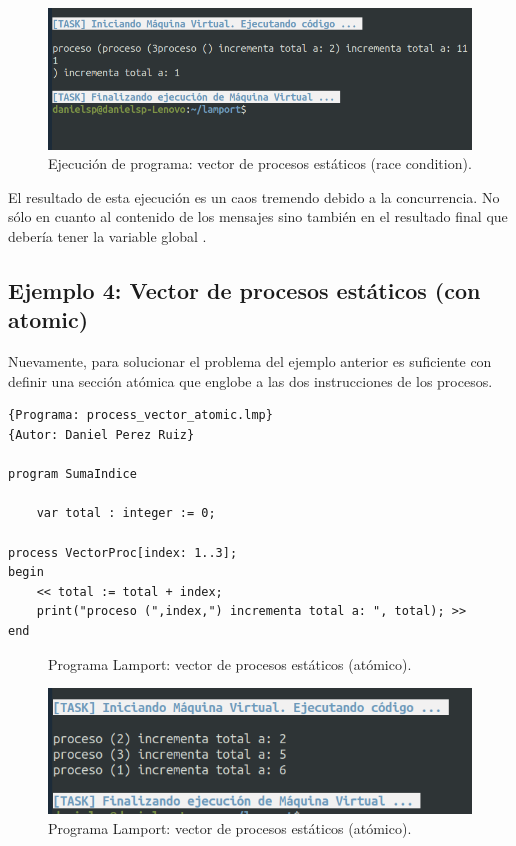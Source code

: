 \begin{figure}[h]
    \includegraphics[width=\linewidth]{images/ejemplos/concurrentes/vector_process.png}
    \caption{Ejecución de programa: vector de procesos estáticos (race condition).}
    \label{fig:lamportProcessVector_exec}
\end{figure}

El resultado de esta ejecución es un caos tremendo debido a la concurrencia. No sólo en cuanto al contenido de los mensajes sino también en el resultado final que debería tener la variable global .

\newpage
\subsection{Ejemplo 4: Vector de procesos estáticos (con atomic)}
Nuevamente, para solucionar el problema del ejemplo anterior es suficiente con definir una sección atómica que englobe a las dos instrucciones de los procesos.
\begin{lstlisting}[style=lamportStyle]
{Programa: process_vector_atomic.lmp}
{Autor: Daniel Perez Ruiz}

program SumaIndice

	var total : integer := 0;

process VectorProc[index: 1..3];
begin
    << total := total + index;
   	print("proceso (",index,") incrementa total a: ", total); >>
end
\end{lstlisting}
\begin{figure}[h]
\caption{Programa Lamport: vector de procesos estáticos (atómico).}
\label{fig:lamportProcessVectorAtomic}
\end{figure}

\begin{figure}[h]
    \includegraphics[width=\linewidth]{images/ejemplos/concurrentes/vector_process_atomic.png}
    \caption{Programa Lamport: vector de procesos estáticos (atómico).}
    \label{fig:lamportProcessVectorAtomic_exec}
\end{figure}

